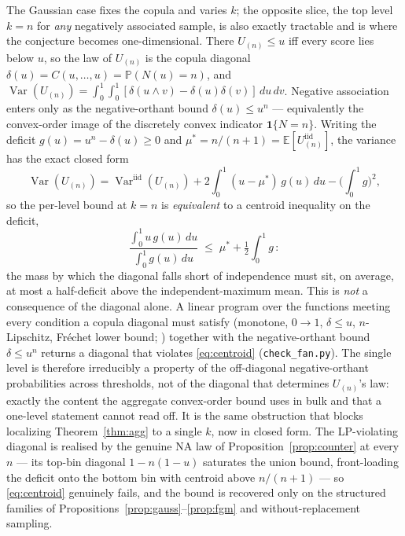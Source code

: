 \documentclass[11pt]{article}
\begin{document}
The Gaussian case fixes the copula and varies $k$; the opposite slice, the top level $k=n$ for
\emph{any} negatively associated sample, is also exactly tractable and is where the conjecture becomes
one-dimensional. There $U_{(n)}\le u$ iff every score lies below $u$, so the law of $U_{(n)}$ is the
copula diagonal $\delta(u)=C(u,\dots,u)=\mathbb P(N(u)=n)$, and
$\operatorname{Var}(U_{(n)})=\int_0^1\!\!\int_0^1[\delta(u\wedge v)-\delta(u)\delta(v)]\,du\,dv$.
Negative association enters only as the negative-orthant bound $\delta(u)\le u^n$
\citep{joagdev1983} --- equivalently the convex-order image of the discretely convex indicator
$\mathbf 1\{N=n\}$. Writing the deficit $g(u)=u^n-\delta(u)\ge 0$ and $\mu^\ast=n/(n+1)=\mathbb
E[U_{(n)}^{\mathrm{iid}}]$, the variance has the exact closed form
\begin{equation}
\operatorname{Var}(U_{(n)})=\operatorname{Var}^{\mathrm{iid}}(U_{(n)})
+2\int_0^1(u-\mu^\ast)\,g(u)\,du-\Big(\int_0^1 g\Big)^{\!2},
\end{equation}
so the per-level bound at $k=n$ is \emph{equivalent} to a centroid inequality on the deficit,
\begin{equation}\label{eq:centroid}
\frac{\int_0^1 u\,g(u)\,du}{\int_0^1 g(u)\,du}\;\le\;\mu^\ast+\tfrac12\!\int_0^1 g\,:
\end{equation}
the mass by which the diagonal falls short of independence must sit, on average, at most a half-deficit
above the independent-maximum mean. This is \emph{not} a consequence of the diagonal alone. A linear
program over the functions meeting every condition a copula diagonal must satisfy (monotone, $0\to1$,
$\delta\le u$, $n$-Lipschitz, Fr\'echet lower bound; \citealp{nelsen2006}) together with the negative-orthant
bound $\delta\le u^n$ returns a diagonal that violates \eqref{eq:centroid} (\texttt{check\_fan.py}).
The single level is therefore irreducibly a property of the off-diagonal negative-orthant probabilities
across thresholds, not of the diagonal that determines $U_{(n)}$'s law: exactly the content the
aggregate convex-order bound uses in bulk and that a one-level statement cannot read off. It is the same
obstruction that blocks localizing Theorem~\ref{thm:agg} to a single $k$, now in closed form. The
LP-violating diagonal is realised by the genuine NA law of Proposition~\ref{prop:counter} at every
$n$ --- its top-bin diagonal $1-n(1-u)$ saturates the union bound, front-loading the deficit onto the
bottom bin with centroid above $n/(n+1)$ --- so \eqref{eq:centroid} genuinely fails, and the bound is
recovered only on the structured families of Propositions~\ref{prop:gauss}--\ref{prop:fgm} and
without-replacement sampling.
\end{document}
